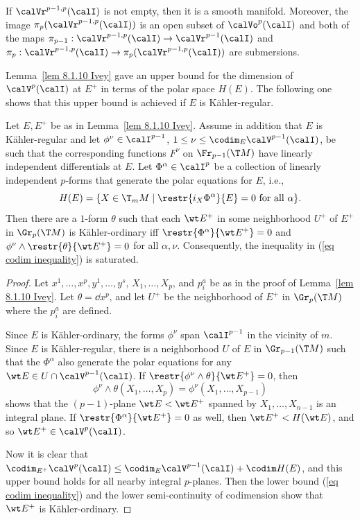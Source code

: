 \begin{prop}
    If $\calVr^{p-1,p}(\calI)$ is not empty, then it is a smooth manifold. Moreover, the image $\pi_{p}(\calVr^{p-1,p}(\calI))$ is an open subset of $\calVo^{p}(\calI)$ and both of the maps $\pi_{p-1}:\calVr^{p-1,p}(\calI)\to \calVr^{p-1}(\calI)$ and $\pi_{p}:\calVr^{p-1,p}(\calI)\to \pi_{p}(\calVr^{p-1,p}(\calI))$ are submersions.
\end{prop}

Lemma~\ref{lem 8.1.10 Ivey} gave an upper bound for the dimension of $\calV^p(\calI)$ at $E^+$ in terms of the polar space $H(E)$. The following one shows that this upper bound is achieved if $E$ is K\"ahler-regular.

\begin{lem}\label{lem 8.1.13 Ivey}
    Let $E,E^+$ be as in Lemma~\ref{lem 8.1.10 Ivey}. Assume in addition that $E$ is K\"ahler-regular and let $\phi^\nu\in\calI^{p-1}$, $1\leq \nu\leq \codim_E \calV^{p-1}(\calI)$, be such that the corresponding functions $F^\nu$ on $\Fr_{p-1}(\T M)$ have linearly independent differentials at $E$. Let $\Phi^\alpha\in\calI^p$ be a collection of linearly independent $p$-forms that generate the polar equations for $E$, i.e.,
    \[H(E)=\{X\in\T_m M\mid \restr{i_X\Phi^\alpha}{E}=0\text{ for all }\alpha\}.\]
    Then there are a $1$-form $\theta$ such that each $\wt E^+$ in some neighborhood $U^+$ of $E^+$ in $\Gr_p(\T M)$ is K\"ahler-ordinary iff $\restr{\Phi^\alpha}{\wt E^+}=0$ and $\phi^\nu\wedge\restr{\theta}{\wt E^+}=0$ for all $\alpha,\nu$. Consequently, the inequality in (\ref{eq codim inequality}) is saturated.
\end{lem}
\begin{proof}
    Let $x^1,\ldots,x^p,y^1,\ldots,y^s$, $X_1,\ldots,X_p$, and $p_i^a$ be as in the proof of Lemma~\ref{lem 8.1.10 Ivey}. Let $\theta=\dd x^p$, and let $U^+$ be the neighborhood of $E^+$ in $\Gr_p(\T M)$ where the $p_i^a$ are defined.

    Since $E$ is K\"ahler-ordinary, the forms $\phi^\nu$ span $\calI^{p-1}$ in the vicinity of $m$. Since $E$ is K\"ahler-regular, there is a neighborhood $U$ of $E$ in $\Gr_{p-1}(\T M)$ such that the $\Phi^\alpha$ also generate the polar equations for any $\wt E\in U\cap \calV^{p-1}(\calI)$. If $\restr{\phi^\nu\wedge\theta}{\wt E^+}=0$, then 
    \[\phi^\nu\wedge \theta(X_1,\ldots,X_p)=\phi^\nu(X_1,\ldots,X_{p-1})\label{eq 8.5 Ivey}\]
    shows that the $(p-1)$-plane $\wt E<\wt E^+$ spanned by $X_1,\ldots,X_{n-1}$ is an integral plane. If $\restr{\Phi^\alpha}{\wt E^+}=0$ as well, then $\wt E^+<H(\wt E)$, and so $\wt E^+\in\calV^p(\calI)$.

    Now it is clear that $\codim_{E^+}\calV^p(\calI)\leq \codim_E\calV^{p-1}(\calI)+\codim H(E)$, and this upper bound holds for all nearby integral $p$-planes. Then the lower bound (\ref{eq codim inequality}) and the lower semi-continuity of codimension show that $\wt E^+$ is K\"ahler-ordinary.
\end{proof}





